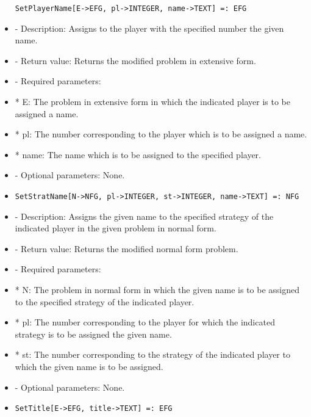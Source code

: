 \begin{itemize}
\begin{verbatim}
SetPlayerName[E->EFG, pl->INTEGER, name->TEXT] =: EFG
\end{verbatim}

\bd
\item
- Description:  Assigns to the player with the specified number the given
name.
\item
- Return value:  Returns the modified problem in extensive form.
\item
- Required parameters:

\bd
\item
*  E:  The problem in extensive form in which the indicated player is
to be assigned a name.
\item
*  pl:  The number corresponding to the player which is to be 
assigned a name.
\item
*  name:  The name which is to be assigned to the specified player.
\ed
\item
- Optional parameters:  None.
\ed

\item

\begin{verbatim}
SetStratName[N->NFG, pl->INTEGER, st->INTEGER, name->TEXT] =: NFG
\end{verbatim}

\bd
\item
- Description:  Assigns the given name to the specified strategy of the
indicated player in the given problem in normal form.
\item
- Return value:  Returns the modified normal form problem.
\item
- Required parameters:
	
\bd
\item
*  N:  The problem in normal form in which the given name is to be
assigned to the specified strategy of the indicated player.
\item
*  pl:  The number corresponding to the player for which the 
indicated strategy is to be assigned the given name.
\item
*  st:  The number corresponding to the strategy of the indicated 
player to which the given name is to be assigned.
\ed

\item
- Optional parameters:  None.

\ed

\item

\begin{verbatim}
SetTitle[E->EFG, title->TEXT] =: EFG
\end{verbatim}


\end{itemize}
